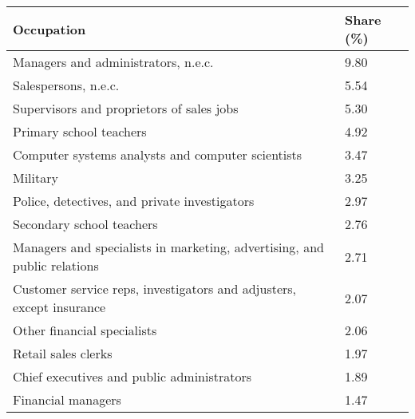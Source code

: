

\begin{tabular}[t]{ll}
\toprule
Occupation & Share (\%)\\
\midrule
Managers and administrators, n.e.c. & 9.80\\
Salespersons, n.e.c. & 5.54\\
Supervisors and proprietors of sales jobs & 5.30\\
Primary school teachers & 4.92\\
Computer systems analysts and computer scientists & 3.47\\
Military & 3.25\\
Police, detectives, and private investigators & 2.97\\
Secondary school teachers & 2.76\\
Managers and specialists in marketing, advertising, and public relations & 2.71\\
Customer service reps, investigators and adjusters, except insurance & 2.07\\
Other financial specialists & 2.06\\
Retail sales clerks & 1.97\\
Chief executives and public administrators & 1.89\\
Financial managers & 1.47\\
\bottomrule
\end{tabular}


